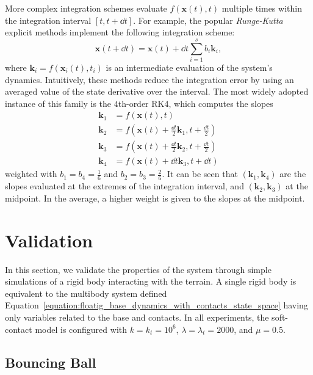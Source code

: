 More complex integration schemes evaluate $f\left(\mathbf{x}(t), t\right)$ multiple times within the integration interval $[t, t+\dd{t}]$.
For example, the popular \emph{Runge-Kutta} explicit methods implement the following integration scheme:
%
\begin{equation*}
    \mathbf{x}(t + \dd{t}) = \mathbf{x}(t) + \dd{t} \sum_{i=1}^{s} b_i \mathbf{k}_i
    ,
\end{equation*}
%
where $\mathbf{k}_i = f\left(\mathbf{x}_i(t), t_i\right)$ is an intermediate evaluation of the system's dynamics.
Intuitively, these methods reduce the integration error by using an averaged value of the state derivative over the interval.
The most widely adopted instance of this family is the $4$th-order \ac{RK4}, which computes the slopes
%
\begin{align*}
    \mathbf{k}_1 &= f\left(\mathbf{x}(t), t\right) \\
    \mathbf{k}_2 &= f\left(\mathbf{x}(t) + \frac{\dd{t}}{2} \mathbf{k}_1, t + \frac{\dd{t}}{2}\right) \\
    \mathbf{k}_3 &= f\left(\mathbf{x}(t) + \frac{\dd{t}}{2} \mathbf{k}_2, t + \frac{\dd{t}}{2}\right) \\
    \mathbf{k}_4 &= f\left(\mathbf{x}(t) + \dd{t} \mathbf{k}_3, t + \dd{t}\right)
\end{align*}
%
weighted with $b_1 = b_4 = \frac{1}{6}$ and $b_2 = b_3 = \frac{2}{6}$.
It can be seen that $(\mathbf{k}_1, \mathbf{k}_4)$ are the slopes evaluated at the extremes of the integration interval, and $(\mathbf{k}_2, \mathbf{k}_3)$ at the midpoint.
In the average, a higher weight is given to the slopes at the midpoint.

\section{Validation}

In this section, we validate the properties of the system through simple simulations of a rigid body interacting with the terrain.
A single rigid body is equivalent to the multibody system defined Equation~\eqref{equation:floatig_base_dynamics_with_contacts_state_space} having only variables related to the base and contacts.
In all experiments, the soft-contact model is configured with $k = k_t = 10^6$, $\lambda = \lambda_t = 2000$, and $\mu=0.5$.

\subsection{Bouncing Ball}

